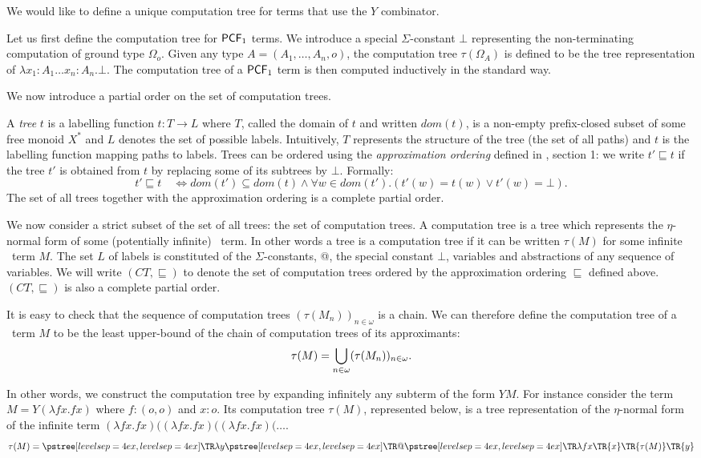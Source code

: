 We would like to define a unique computation tree for terms that use
the $Y$ combinator.

Let us first define the computation tree for $\textsf{PCF}_1$ terms. We
introduce a special $\Sigma$-constant $\bot$ representing the
non-terminating computation of ground type $\Omega_o$. Given any
type $A = (A_1, \ldots, A_n, o)$, the computation tree
$\tau(\Omega_A)$ is defined to be the tree representation of
$\lambda x_1:A_1 \ldots x_n:A_n . \bot$. The computation tree of a
$\textsf{PCF}_1$ term is then computed inductively in the standard way.

We now introduce a partial order on the set of computation trees.

A \emph{tree} $t$ is a labelling function $t:T\rightarrow L$ where
$T$, called the domain of $t$ and written $dom(t)$, is a non-empty
prefix-closed subset of some free monoid $X^*$ and $L$ denotes the
set of possible labels. Intuitively, $T$ represents the structure of
the tree (the set of all paths) and $t$ is the labelling function
mapping paths to labels. Trees can be ordered using the
\emph{approximation ordering} defined in \cite{KNU02}, section 1: we
write $t' \sqsubseteq t$ if the tree $t'$ is obtained from $t$ by
replacing some of its subtrees by $\bot$. Formally:
$$t' \sqsubseteq t \quad \iff dom(t') \subseteq dom(t) \wedge \forall  w \in dom(t'). (t'(w) = t(w) \vee t'(w) = \bot).$$
The set of all trees together with the approximation ordering is a
complete partial order.

We now consider a strict subset of the set of all trees: the set of
computation trees. A computation tree is a tree which represents the
$\eta$-normal form of some (potentially infinite) \pcf\ term. In
other words a tree is a computation tree if it can be written
$\tau(M)$ for some infinite \pcf\ term $M$. The set $L$ of labels is
constituted of the $\Sigma$-constants, @, the special constant
$\bot$, variables and abstractions of any sequence of variables. We
will write $(CT, \sqsubseteq)$ to denote the set of computation
trees ordered by the approximation ordering $\sqsubseteq$ defined
above. $(CT, \sqsubseteq)$ is also a complete partial order.

It is easy to check that the sequence of computation trees
$(\tau(M_n))_{n\in\omega}$ is a chain. We can therefore define the
computation tree of a \pcf\ term $M$ to be the least upper-bound of
the chain of computation trees of its approximants:
$$\tau(M) = \bigcup_{n\in\omega}(\tau(M_n))_{n\in\omega}.$$

In other words, we construct the computation tree by expanding
infinitely any subterm of the form $Y M$. For instance consider the
term $M = Y (\lambda f x. f x)$ where $f:(o,o)$ and $x:o$. Its
computation tree $\tau(M)$, represented below, is a tree
representation of the $\eta$-normal form of the infinite term
$(\lambda f x. f x) ((\lambda f x. f x) ((\lambda f x. f x)  (
\ldots$.
$$\tau(M) = \tree{\lambda y}{
                \tree{@}{
                   \tree{\lambda f x} {\TR{x}}
                   \TR{\tau(M)} \TR{y}
                }
            }
$$

